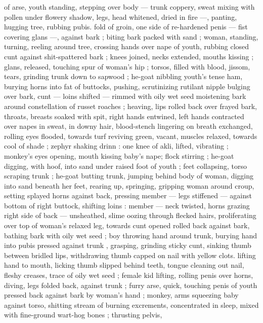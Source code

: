 {of arse, youth standing, stepping over body --- trunk coppery, sweat 
mixing with pollen under flowery shadow, legs, head whitened, dried 
in fire ---, panting, hugging tree, rubbing pubis. fold of groin, one 
side of re-hardened penis --- fist covering glans ---, against bark ; 
biting bark packed with sand ; woman, standing, turning, reeling 
around tree, crossing hands over nape of youth, rubbing closed cunt 
against shit-spattered bark ; knees joined, necks extended, mouths 
kissing ; glans, released, touching spur of woman's hip ; torsos, filled 
with blood, jissom, tears, grinding trunk down to sapwood ; he-goat 
nibbling youth's tense ham, burying horns into fat of buttocks, 
pushing, scrutinizing rutilant nipple bulging over bark, cunt --- loins 
shifted --- rimmed with oily wet seed moistening bark around 
constellation of russet roaches ; heaving, lips rolled back over frayed 
bark, throats, breasts soaked with spit, right hands entwined, left 
hands contracted over napes in sweat, in downy hair, blood-stench 
lingering on breath exchanged, rolling eyes flooded, towards turf 
reviving green, vacant, muscles relaxed, towards cool of shade ; 
zephyr shaking drinn : one knee of akli, lifted, vibrating ; monkey's 
eyes opening, mouth kissing baby's nape; flock stirring ; he-goat 
digging, with hoof, into sand under raised foot of youth ; feet 
collapsing, torso scraping trunk ; he-goat butting trunk, jumping 
behind body of woman, digging into sand beneath her feet, rearing 
up, springing, gripping woman around croup, setting splayed horns 
against back, pressing member --- legs stiffened --- against bottom 
of right buttock, shifting loins : member --- neck twisted, horns 
grazing right side of back --- unsheathed, slime oozing through 
flecked hairs, proliferating over top of woman's relaxed leg, towards 
cunt opened rolled back against bark, bathing bark with oily wet seed 
; boy throwing hand around trunk, burying hand into pubis pressed 
against trunk , grasping, grinding sticky cunt, sinking thumb between 
bridled lips, withdrawing thumb capped on nail with yellow clots. 
lifting hand to mouth, licking thumb slipped behind teeth, tongue 
cleaning out nail, fleshy creases, trace of oily wet seed ; female kid 
lifting, rolling penis over horns, diving, legs folded back, against 
trunk ; furry arse, quick, touching penis of youth pressed back 
against bark by woman's hand ; monkey, arms squeezing baby 
against torso, shitting stream of burning excrements, concentrated 
in sleep, mixed with fine-ground wart-hog bones ; thrusting pelvis, 
}
